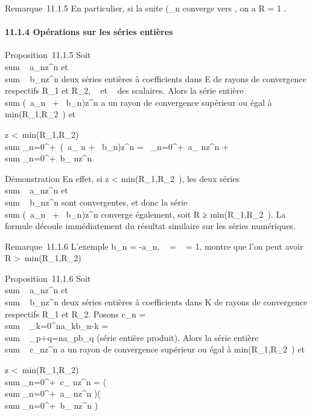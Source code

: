 \documentclass[]{article}
\begin{document}
Remarque~11.1.5 En particulier, si la suite
(\rootn\of\a_n\)
converge vers \ell, on a R = 1 \over \ell .

\paragraph{11.1.4 Opérations sur les séries entières}

Proposition~11.1.5 Soit
\\sum ~
a_nz^n et
\\sum ~
b_nz^n deux séries entières à coefficients dans E de
rayons de convergence respectifs R_1 et R_2, \alpha~ et \beta~
des scalaires. Alors la série entière
\\sum  (\alpha~a_n~ +
\beta~b_n)z^n a un rayon de convergence supérieur ou égal
à min(R_1,R_2~) et

z <\
min(R_1,R_2) \rigtharrow~\\sum
_n=0^+\infty~(\alpha~a_ n + \beta~b_n)z^n =
\alpha~\sum _n=0^+\infty~a_
nz^n + \beta~\\sum
_n=0^+\infty~b_ nz^n

Démonstration En effet, si z
< min(R_1,R_2~),
les deux séries \\sum ~
a_nz^n et
\\sum ~
b_nz^n sont convergentes, et donc la série
\\sum  (\alpha~a_n~ +
\beta~b_n)z^n converge également, soit R
≥ min(R_1,R_2~). La formule
découle immédiatement du résultat similaire sur les séries numériques.

Remarque~11.1.6 L'exemple b_n = -a_n, \alpha~ = \beta~ = 1,
montre que l'on peut avoir R >\
min(R_1,R_2)

Proposition~11.1.6 Soit
\\sum ~
a_nz^n et
\\sum ~
b_nz^n deux séries entières à coefficients dans K de
rayons de convergence respectifs R_1 et R_2. Posons
c_n = \\sum ~
_k=0^na_kb_n-k
= \\sum ~
_p+q=na_pb_q (série entière produit). Alors la
série entière \\sum ~
c_nz^n a un rayon de convergence supérieur ou égal à
min(R_1,R_2~) et

z <\
min(R_1,R_2) \rigtharrow~\\sum
_n=0^+\infty~c_ nz^n =
\left (\\sum
_n=0^+\infty~a_ nz^n\right
)\left (\\sum
_n=0^+\infty~b_ nz^n\right
)
\end{document}
